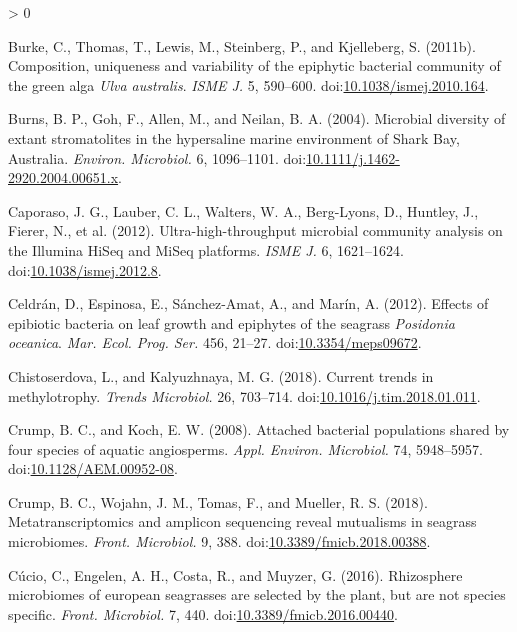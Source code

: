 \documentclass[
  12pt,
]{article}
\newlength{\cslhangindent}
\newenvironment{CSLReferences}[2] %
 {%
  \setlength{\parindent}{0pt}
  \ifodd #1 \everypar{\setlength{\hangindent}{\cslhangindent}}\ignorespaces\fi
  \ifnum #2 > 0
  \setlength{\parskip}{#2\baselineskip}
  \fi
 }%
 {}
\begin{document}
\begin{CSLReferences}{1}{0}
\leavevmode\hypertarget{ref-Burke2011a}{}%
Burke, C., Thomas, T., Lewis, M., Steinberg, P., and Kjelleberg, S.
(2011b). Composition, uniqueness and variability of the epiphytic
bacterial community of the green alga {\emph{Ulva australis}}.
\emph{ISME J.} 5, 590--600.
doi:\href{https://doi.org/10.1038/ismej.2010.164}{10.1038/ismej.2010.164}.

\leavevmode\hypertarget{ref-Burns2004}{}%
Burns, B. P., Goh, F., Allen, M., and Neilan, B. A. (2004). Microbial
diversity of extant stromatolites in the hypersaline marine environment
of {Shark Bay}, {Australia}. \emph{Environ. Microbiol.} 6, 1096--1101.
doi:\href{https://doi.org/10.1111/j.1462-2920.2004.00651.x}{10.1111/j.1462-2920.2004.00651.x}.

\leavevmode\hypertarget{ref-Caporaso2012}{}%
Caporaso, J. G., Lauber, C. L., Walters, W. A., Berg-Lyons, D., Huntley,
J., Fierer, N., et al. (2012). Ultra-high-throughput microbial community
analysis on the {Illumina HiSeq} and {MiSeq} platforms. \emph{ISME J.}
6, 1621--1624.
doi:\href{https://doi.org/10.1038/ismej.2012.8}{10.1038/ismej.2012.8}.

\leavevmode\hypertarget{ref-Celdran2012}{}%
Celdrán, D., Espinosa, E., Sánchez-Amat, A., and Marín, A. (2012).
Effects of epibiotic bacteria on leaf growth and epiphytes of the
seagrass {\emph{Posidonia oceanica}}. \emph{Mar. Ecol. Prog. Ser.} 456,
21--27. doi:\href{https://doi.org/10.3354/meps09672}{10.3354/meps09672}.

\leavevmode\hypertarget{ref-Chistoserdova2018}{}%
Chistoserdova, L., and Kalyuzhnaya, M. G. (2018). Current trends in
methylotrophy. \emph{Trends Microbiol.} 26, 703--714.
doi:\href{https://doi.org/10.1016/j.tim.2018.01.011}{10.1016/j.tim.2018.01.011}.

\leavevmode\hypertarget{ref-Crump2008}{}%
Crump, B. C., and Koch, E. W. (2008). Attached bacterial populations
shared by four species of aquatic angiosperms. \emph{Appl. Environ.
Microbiol.} 74, 5948--5957.
doi:\href{https://doi.org/10.1128/AEM.00952-08}{10.1128/AEM.00952-08}.

\leavevmode\hypertarget{ref-Crump2018}{}%
Crump, B. C., Wojahn, J. M., Tomas, F., and Mueller, R. S. (2018).
Metatranscriptomics and amplicon sequencing reveal mutualisms in
seagrass microbiomes. \emph{Front. Microbiol.} 9, 388.
doi:\href{https://doi.org/10.3389/fmicb.2018.00388}{10.3389/fmicb.2018.00388}.

\leavevmode\hypertarget{ref-Cucio2016}{}%
Cúcio, C., Engelen, A. H., Costa, R., and Muyzer, G. (2016). Rhizosphere
microbiomes of european seagrasses are selected by the plant, but are
not species specific. \emph{Front. Microbiol.} 7, 440.
doi:\href{https://doi.org/10.3389/fmicb.2016.00440}{10.3389/fmicb.2016.00440}.


\end{CSLReferences}
\end{document}
